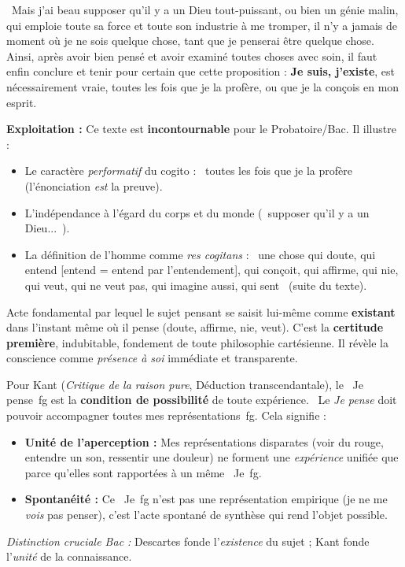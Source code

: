 \documentclass[11pt]{article}
\begin{document}
\begin{exemplebox}
\og~Mais j'ai beau supposer qu'il y a un Dieu tout-puissant, ou bien un génie malin, qui emploie toute sa force et toute son industrie à me tromper, il n'y a jamais de moment où je ne sois quelque chose, tant que je penserai être quelque chose. Ainsi, après avoir bien pensé et avoir examiné toutes choses avec soin, il faut enfin conclure et tenir pour certain que cette proposition : \textbf{Je suis, j'existe}, est nécessairement vraie, toutes les fois que je la profère, ou que je la conçois en mon esprit.~\fg{}

\medskip\noindent\textbf{Exploitation :} Ce texte est \textbf{incontournable} pour le Probatoire/Bac. Il illustre :
\begin{itemize}
    \item Le caractère \emph{performatif} du cogito : \og~toutes les fois que je la profère~\fg{} (l'énonciation \emph{est} la preuve).
    \item L'indépendance à l'égard du corps et du monde (\og~supposer qu'il y a un Dieu...~\fg{}).
    \item La définition de l'homme comme \emph{res cogitans} : \og~une chose qui doute, qui entend [entend = entend par l'entendement], qui conçoit, qui affirme, qui nie, qui veut, qui ne veut pas, qui imagine aussi, qui sent~\fg{} (suite du texte).
\end{itemize}
\end{exemplebox}

\begin{definition}[Le Cogito]
Acte fondamental par lequel le sujet pensant se saisit lui-même comme \textbf{existant} dans l'instant même où il pense (doute, affirme, nie, veut). C'est la \textbf{certitude première}, indubitable, fondement de toute philosophie cartésienne. Il révèle la conscience comme \emph{présence à soi} immédiate et transparente.
\end{definition}

\begin{propriete}
Pour Kant (\emph{Critique de la raison pure}, Déduction transcendantale), le \og~Je pense~fg{} est la \textbf{condition de possibilité} de toute expérience. \og~Le \emph{Je pense} doit pouvoir accompagner toutes mes représentations~fg{}. Cela signifie :
\begin{itemize}
    \item \textbf{Unité de l'aperception :} Mes représentations disparates (voir du rouge, entendre un son, ressentir une douleur) ne forment une \emph{expérience} unifiée que parce qu'elles sont rapportées à un même \og~Je~fg{}.
    \item \textbf{Spontanéité :} Ce \og~Je~fg{} n'est pas une représentation empirique (je ne me \emph{vois} pas penser), c'est l'acte spontané de synthèse qui rend l'objet possible.
\end{itemize}
\emph{Distinction cruciale Bac :} Descartes fonde l'\emph{existence} du sujet ; Kant fonde l'\emph{unité} de la connaissance.
\end{propriete}
\end{document}
